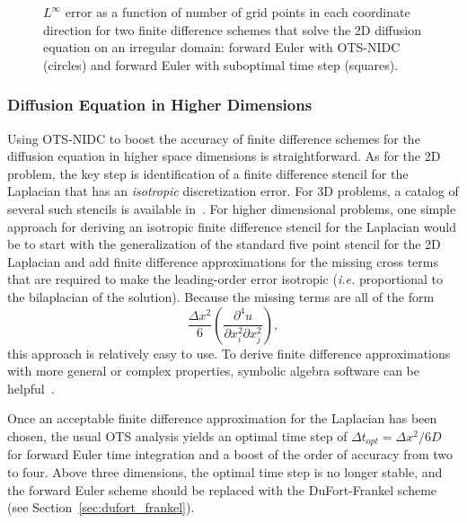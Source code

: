 \documentclass[fleqn,12pt,twoside]{article}
\newcommand{\beq}{\begin{equation}}
\newcommand{\eeq}{\end{equation}}
\def\dt{\Delta t}
\def\dx{\Delta x}
\def\ie{\emph{i.e. }}
\begin{document}
\begin{figure}[tb]
\begin{center}
\caption{$L^\infty$ error as a function of number of grid points in each
coordinate direction for two finite difference schemes that solve the 2D 
diffusion equation on an irregular domain: forward Euler with OTS-NIDC 
(circles) and forward Euler with suboptimal time step (squares).  
}
\label{fig:diffusion_eqn_2d_starfish_error}
\end{center}
\end{figure}


\subsubsection{Diffusion Equation in Higher Dimensions}
Using OTS-NIDC to boost the accuracy of finite difference
schemes for the diffusion equation in higher space dimensions is 
straightforward.  As for the 2D problem, the key step is identification of a 
finite difference stencil for the Laplacian that has an \emph{isotropic} 
discretization error.  For 3D problems, a catalog of several such stencils is 
available in~\cite{patra_2005}.   For higher dimensional problems, one simple
approach for deriving an isotropic finite difference stencil for the Laplacian
would be to start with the generalization of the standard five point stencil
for the 2D Laplacian and add finite difference approximations for the missing 
cross terms that are required to make the leading-order error isotropic 
(\ie proportional to the bilaplacian of the solution).  Because the missing 
terms are all of the form 
\beq
\frac{\dx^2}{6} \left(\frac{\partial^4 u}{\partial x_i^2 \partial x_j^2}\right),
\eeq
this approach is relatively easy to use.  To derive finite difference 
approximations with more general or complex properties, symbolic algebra 
software can be helpful~\cite{patra_2005,gupta_1998}.  

Once an acceptable finite difference approximation for the Laplacian has been 
chosen, the usual OTS analysis yields an optimal time step of 
$\dt_{opt} = \dx^2/6D$ for forward Euler time integration and a boost of the 
order of accuracy from two to four.  Above three dimensions, the optimal
time step is no longer stable, and the forward Euler scheme should be replaced
with the DuFort-Frankel scheme (see Section~\ref{sec:dufort_frankel}).
\end{document}
